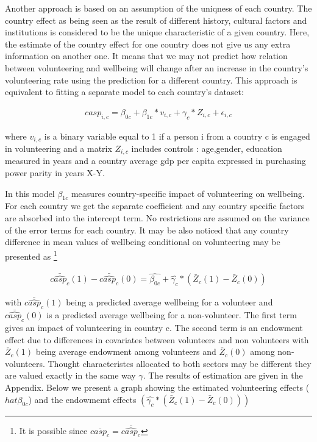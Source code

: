 \documentclass[10pt, letterpaper]{article}
\begin{document}
\begin{spacing}{1.4}
Another approach is based on an assumption of the uniqness of each country. The country effect as being seen as the result of different history, cultural factors and institutions is considered to be the unique characteristic of a given country. Here, the estimate of the country effect for one country does not give us any extra information on another one. It means that we may not predict how relation between volunteering and wellbeing will change  after an increase in the country's volunteering rate using the prediction for a different country. This approach is equivalent to fitting a separate model to each country’s dataset:  

 \begin{eqnarray}
	casp_{i,c}= \beta_{0c}+ \beta_{1c}*v_{i,c} + \gamma_{c}*Z_{i,c} + \epsilon_{i,c}
 \end{eqnarray}

where $v_{i,c}$ is a binary variable equal to 1 if a person i from a country c is engaged in  volunteering  and a matrix $Z_{i,c}$ includes controls : age,gender, education measured in years and a country average gdp per capita expressed in purchasing power parity in years X-Y. 


In this model $\beta_{1c}$ measures country-specific impact of volunteering on wellbeing. For each country we get the separate coefficient and any country specific factors are absorbed into the intercept term. No restrictions are assumed on the variance of the error terms for each country. It may be also noticed that any country difference in mean values of wellbeing conditional on volunteering may be presented as \footnote{It is possible since $\bar{casp_{c}} = \bar{\hat{casp_c}}$} 

 \begin{eqnarray}
	\bar{\hat{casp_{c}}}(1)-\bar{\hat{casp_{c}}}(0)= \hat{\beta_{0c}}+\hat{\gamma_{c}}*(\bar{Z}_{c}(1)-\bar{Z}_{c}(0))
 \end{eqnarray}

with $\bar{\hat{casp_{c}}}(1)$ being a predicted average wellbeing for a volunteer and $\bar{\hat{casp_{c}}}(0)$ is a predicted average wellbeing for a non-volunteer.  The first term gives an impact of volunteering in country c. The second term is an endowment effect due to  differences in covariates between volunteers and non volunteers with $\bar{Z}_{c}(1)$ being average endowment among volunteers and $\bar{Z}_{c}(0)$ among non-volunteers. Thought characteristcs allocated to both sectors may be different they are valued exactly in the same way $\gamma$. The results of estimation are given in the Appendix. Below we present a graph showing the estimated volunteering effects ($ hat{\beta_{0c}} $) and the endowmemt effects $(\hat{\gamma_{c}}*(\bar{Z}_{c}(1)-\bar{Z}_{c}(0)))$


\end{spacing}
\end{document}

